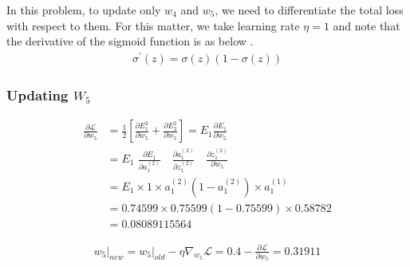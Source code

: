 \documentclass[conference]{IEEEtran}
\begin{document}
In this problem, to update only $w_4$ and $w_5$, we need to differentiate the total loss with respect to them. For this matter, we take learning rate $\eta = 1$ and note that the derivative of the sigmoid function is as below \cite{b3}.
\begin{align}
    \sigma^\prime (z) = \sigma(z) \left(1 - \sigma(z)\right)
\end{align}

\subsubsection{Updating $W_5$}

{\setlength{\jot}{8pt}
    \begin{align}
        \frac{\partial \mathcal{L}}{\partial w_5} & = \frac{1}{2} \left[\frac{\partial E_1^2}{\partial w_5} + \frac{\partial E_2^2}{\partial w_5} \right]= E_1\frac{\partial E_1}{\partial w_5}                    \\
                                                  & = E_1 \,\, \frac{\partial E_1}{\partial a_1^{(2)}}    \quad   \frac{\partial a_1^{(2)}}{\partial z_1^{(2)}}    \quad   \frac{\partial z_1^{(2)}}{\partial w_5} \\
                                                  & = E_1 \times 1 \times a_1^{(2)} \left(1 - a_1^{(2)}\right)  \times a_1^{(1)}                                                                                   \\
                                                  & = 0.74599 \times 0.75599 (1 - 0.75599) \times 0.58782 \nonumber                                                                                                \\
                                                  & = \mathbf{0.08089115564}
    \end{align}}

\begin{align*}
    \left. w_5\right|_{new} = \left. w_5\right|_{old} - \eta \nabla_{w_5} \mathcal{L} = 0.4 - \frac{\partial \mathcal{L}}{\partial w_5} = \mathbf{0.31911}
\end{align*}
\end{document}
